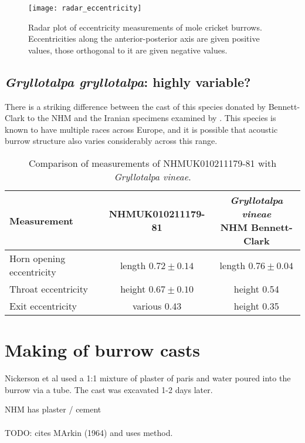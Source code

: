 \documentclass{article}
\begin{document}
      \begin{figure}[h]
      	\texttt{[image: radar\_eccentricity]}
      	\caption{Radar plot of eccentricity measurements of mole cricket burrows. Eccentricities along the anterior-posterior axis are given positive values, those orthogonal to it are given negative values.}
      	\label{fig:radar_eccentricity}
      \end{figure}
      
   
   \subsection{\textit{Gryllotalpa gryllotalpa}: highly variable?}
   There is a striking difference between the cast of this species donated by Bennett-Clark to the NHM and the Iranian specimens examined by \cite{jafari2015}. This species is known to have multiple races across Europe, and it is possible that acoustic burrow structure also varies considerably across this range.
   
   \begin{table}[h]
   	\begin{tabular}{|l|c|c|}
   		\hline 	Measurement &
		   		NHMUK010211179-81 &
		   		\makecell{\textit{Gryllotalpa vineae}\\NHM Bennett-Clark} \\ 
   		\hline  Horn opening eccentricity &
		   		length $0.72\pm0.14$ &
		   		length $0.76\pm0.04$  \\
   		\hline	Throat eccentricity &
		   		height $0.67\pm0.10$ &
		   		height 0.54 \\
   		\hline  Exit eccentricity &
		   		various 0.43 &
			   	height 0.35 \\
   		
   		\hline 
   	\end{tabular}
   	\caption{Comparison of measurements of NHMUK010211179-81 with \textit{Gryllotalpa vineae}.}
   	\label{tab:id_nhm_casts}
   \end{table}
   
   \section{Making of burrow casts}
   Nickerson et al \cite{nickerson1979} used a 1:1 mixture of plaster of paris and water poured into the burrow via a tube. The cast was excavated 1-2 days later.
   
   NHM has plaster / cement
   \paragraph{}
   TODO: \cite{kavanagh1989} cites MArkin (1964) and uses method.
\end{document}

